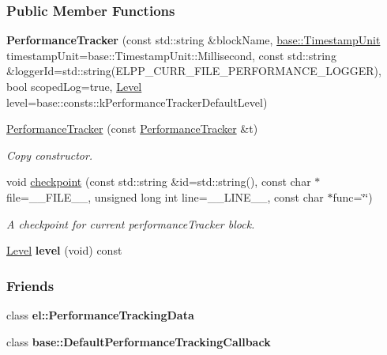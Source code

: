 \subsubsection*{Public Member Functions}
\begin{DoxyCompactItemize}
\item 
\hypertarget{a00065_a46ac6a851c6d1cde6742a7ebfeedd1b6}{}{\bfseries Performance\+Tracker} (const std\+::string \&block\+Name, \hyperlink{a00184_a1b886858c6409097395b24b1bdf03c39}{base\+::\+Timestamp\+Unit} timestamp\+Unit=base\+::\+Timestamp\+Unit\+::\+Millisecond, const std\+::string \&logger\+Id=std\+::string(E\+L\+P\+P\+\_\+\+C\+U\+R\+R\+\_\+\+F\+I\+L\+E\+\_\+\+P\+E\+R\+F\+O\+R\+M\+A\+N\+C\+E\+\_\+\+L\+O\+G\+G\+E\+R), bool scoped\+Log=true, \hyperlink{a00183_ab0ac6091262344c52dd2d3ad099e8e36}{Level} level=base\+::consts\+::k\+Performance\+Tracker\+Default\+Level)\label{a00065_a46ac6a851c6d1cde6742a7ebfeedd1b6}

\item 
\hypertarget{a00065_a49e655c1f414f904b2d6a9abb0d344f4}{}\hyperlink{a00065_a49e655c1f414f904b2d6a9abb0d344f4}{Performance\+Tracker} (const \hyperlink{a00065}{Performance\+Tracker} \&t)\label{a00065_a49e655c1f414f904b2d6a9abb0d344f4}

\begin{DoxyCompactList}\small\item\em Copy constructor. \end{DoxyCompactList}\item 
\hypertarget{a00065_aec9a6e149674c5782cc855e49aeb0aaf}{}void \hyperlink{a00065_aec9a6e149674c5782cc855e49aeb0aaf}{checkpoint} (const std\+::string \&id=std\+::string(), const char $\ast$file=\+\_\+\+\_\+\+F\+I\+L\+E\+\_\+\+\_\+, unsigned long int line=\+\_\+\+\_\+\+L\+I\+N\+E\+\_\+\+\_\+, const char $\ast$func=\char`\"{}\char`\"{})\label{a00065_aec9a6e149674c5782cc855e49aeb0aaf}

\begin{DoxyCompactList}\small\item\em A checkpoint for current performance\+Tracker block. \end{DoxyCompactList}\item 
\hypertarget{a00065_a3e0ebd666cc7416dc9b818418266161b}{}\hyperlink{a00183_ab0ac6091262344c52dd2d3ad099e8e36}{Level} {\bfseries level} (void) const \label{a00065_a3e0ebd666cc7416dc9b818418266161b}

\end{DoxyCompactItemize}
\subsubsection*{Friends}
\begin{DoxyCompactItemize}
\item 
\hypertarget{a00065_a7a4da7334b79856c37538484584207a6}{}class {\bfseries el\+::\+Performance\+Tracking\+Data}\label{a00065_a7a4da7334b79856c37538484584207a6}

\item 
\hypertarget{a00065_ad346c4097e3db22a7434e7da5aa9c5e3}{}class {\bfseries base\+::\+Default\+Performance\+Tracking\+Callback}\label{a00065_ad346c4097e3db22a7434e7da5aa9c5e3}

\end{DoxyCompactItemize}
